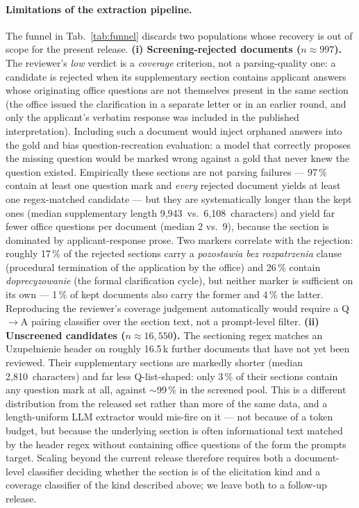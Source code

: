 \paragraph{Limitations of the extraction pipeline.}
The funnel in Tab.~\ref{tab:funnel} discards two populations whose
recovery is out of scope for the present release.
\textbf{(i) Screening-rejected documents ($n \approx 997$).} The
reviewer's \textit{low} verdict is a \emph{coverage} criterion, not
a parsing-quality one: a candidate is rejected when its
supplementary section contains applicant answers whose originating
office questions are not themselves present in the same section
(the office issued the clarification in a separate letter or in an
earlier round, and only the applicant's verbatim response was
included in the published interpretation). Including such a
document would inject orphaned answers into the gold and bias
question-recreation evaluation: a model that correctly proposes
the missing question would be marked wrong against a gold that
never knew the question existed. Empirically these sections are
not parsing failures --- 97\,\% contain at least one question mark
and \emph{every} rejected document yields at least one regex-matched
candidate --- but they are systematically longer than the kept ones
(median supplementary length 9{,}943~vs.\ 6{,}108~characters) and
yield far fewer office questions per document (median 2 vs.\ 9),
because the section is dominated by applicant-response prose.
Two markers correlate with the rejection: roughly 17\,\% of the
rejected sections carry a \textit{pozostawia bez rozpatrzenia}
clause (procedural termination of the application by the office)
and 26\,\% contain \textit{doprecyzowanie} (the formal clarification
cycle), but neither marker is sufficient on its own --- 1\,\% of
kept documents also carry the former and 4\,\% the latter.
Reproducing the reviewer's coverage judgement automatically would
require a Q$\to$A pairing classifier over the section text, not a
prompt-level filter. \textbf{(ii) Unscreened candidates
($n \approx 16{,}550$).} The sectioning regex matches an
Uzupe\l{}nienie header on roughly 16.5\,k further documents that
have not yet been reviewed. Their supplementary sections are
markedly shorter (median 2{,}810~characters) and far less
Q-list-shaped: only 3\,\% of their sections contain any question
mark at all, against $\sim$99\,\% in the screened pool. This is a
different distribution from the released set rather than more of
the same data, and a length-uniform LLM extractor would mis-fire on
it --- not because of a token budget, but because the underlying
section is often informational text matched by the header regex
without containing office questions of the form the prompts target.
Scaling beyond the current release therefore requires both a
document-level classifier deciding whether the section is of the
elicitation kind and a coverage classifier of the kind described
above; we leave both to a follow-up release.

